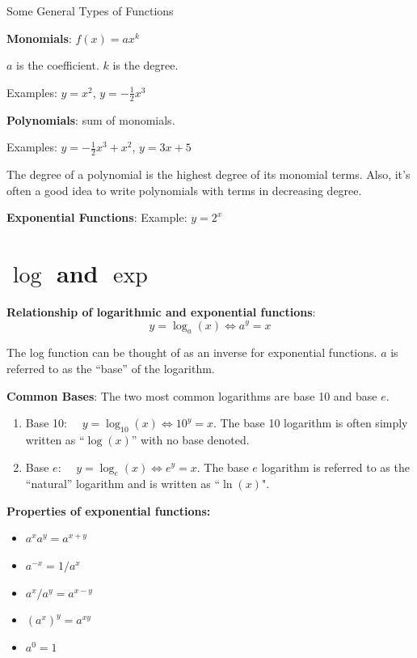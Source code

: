\documentclass[]{book}
\providecommand{\tightlist}{%
  \setlength{\itemsep}{0pt}\setlength{\parskip}{0pt}}
\theoremstyle{definition}
\theoremstyle{definition}
\theoremstyle{definition}
\theoremstyle{remark}
\begin{document}
Some General Types of Functions

\textbf{Monomials}: \(f(x)=a x^k\)

\(a\) is the coefficient. \(k\) is the degree.

Examples: \(y=x^2\), \(y=-\frac{1}{2}x^3\)

\textbf{Polynomials}: sum of monomials.

Examples: \(y=-\frac{1}{2}x^3+x^2\), \(y=3x+5\)

The degree of a polynomial is the highest degree of its monomial terms. Also, it's often a good idea to write polynomials with terms in decreasing degree.

\textbf{Exponential Functions}: Example: \(y=2^x\)

\hypertarget{logexponents}{%
\section{\texorpdfstring{\(\log\) and \(\exp\)}{\textbackslash{}log and \textbackslash{}exp}}\label{logexponents}}

\textbf{Relationship of logarithmic and exponential functions}:
\[y=\log_a(x) \iff a^y=x\]

The log function can be thought of as an inverse for exponential functions. \(a\) is referred to as the ``base'' of the logarithm.

\textbf{Common Bases}: The two most common logarithms are base 10 and base \(e\).

\begin{enumerate}
\def\labelenumi{\arabic{enumi}.}
\tightlist
\item
  Base 10: \(\quad y=\log_{10}(x) \iff 10^y=x\). The base 10 logarithm is often simply written as ``\(\log(x)\)'' with no base denoted.
\item
  Base \(e\): \(\quad y=\log_e(x) \iff e^y=x\). The base \(e\) logarithm is referred to as the ``natural'' logarithm and is written as ``\(\ln(x)\)".
\end{enumerate}

\textbf{Properties of exponential functions:}

\begin{itemize}
\tightlist
\item
  \(a^x a^y = a^{x+y}\)
\item
  \(a^{-x} = 1/a^x\)
\item
  \(a^x/a^y = a^{x-y}\)
\item
  \((a^x)^y = a^{x y}\)
\item
  \(a^0 = 1\)
\end{itemize}
\end{document}
